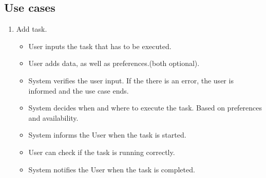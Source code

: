 \subsection{Use cases}
\begin{enumerate}
	\item Add task.
	\begin{itemize}
		\item User inputs the task that has to be executed.
		\item User adds data, as well as preferences.(both optional).
		\item System verifies the user input. If the there is an error, the user is informed and the use case ends.
		\item System decides when and where to execute the task. Based on preferences and availability.
		\item System informs the User when the task is started.
		\item User can check if the task is running correctly.
		\item System notifies the User when the task is completed.
	\end{itemize}
\end{enumerate}